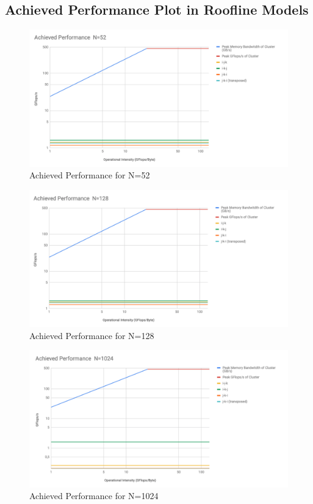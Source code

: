 \documentclass{article}
\begin{document}
\begin{appendices}
\section{Achieved Performance Plot in Roofline Models}
\label{plot_achieved_roofline}

\begin{figure}[H]
    \centering
    \includegraphics[width=15cm]{Pictures/roofline_ap_52.png}
    \caption{Achieved Performance for N=52}
    \label{fig:roofline_ap_52}
\end{figure}

\begin{figure}[H]
    \centering
    \includegraphics[width=15cm]{Pictures/roofline_ap_128.png}
    \caption{Achieved Performance for N=128}
    \label{fig:roofline_ap_128}
\end{figure}

\begin{figure}[H]
    \centering
    \includegraphics[width=15cm]{Pictures/roofline_ap_1024.png}
    \caption{Achieved Performance for N=1024}
    \label{fig:roofline_ap_1024}
\end{figure}


\end{appendices}
\end{document}

